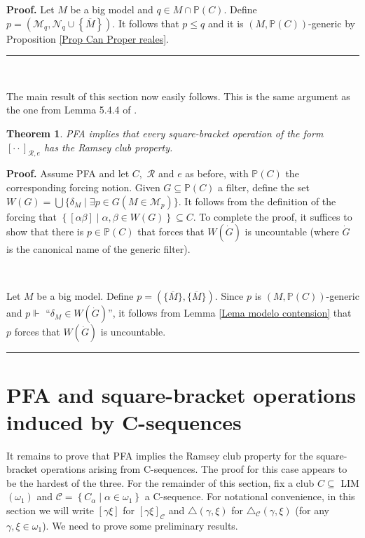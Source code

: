 \documentclass{article}
\newtheorem{theorem}{Theorem}
\newenvironment{proof}[1][Proof]{\noindent\textbf{#1.} }{\ \rule{0.5em}{0.5em}}
\begin{document}
\begin{proof}
Let $M$ be a big model and $q\in M\cap\mathbb{P}\left(  C\right)  .$ Define
$p=(\mathcal{M}_{q},\mathcal{N}_{q}\cup\left\{  \overline{M}\right\}  ).$ It
follows that $p\leq q$ and it is $(M,\mathbb{P}\left(  C\right)  )$-generic by
Proposition \ref{Prop Can Proper reales}.
\end{proof}

\qquad\ \qquad\ \qquad\ \ \ \ 

The main result of this section now easily follows. This is the same argument
as the one from Lemma 5.4.4 of \cite{Walks}.

\begin{theorem}
\textsf{PFA }implies that every square-bracket operation of the form
$[\cdot\cdot]_{\mathcal{R},e}$ has the Ramsey club property.
\label{PFA para reales}
\end{theorem}

\begin{proof}
Assume \textsf{PFA }and let $C,$ $\mathcal{R}$ and $e$ as before, with
$\mathbb{P}\left(  C\right)  $ the corresponding forcing notion. Given
$G\subseteq\mathbb{P}\left(  C\right)  $ a filter, define the set $W\left(
G\right)  =\bigcup\{\delta_{M}\mid\exists p\in G\left(  M\in\mathcal{M}%
_{p}\right)  \}.$ It follows from the definition of the forcing that $\left\{
\left[  \alpha\beta\right]  \mid\alpha,\beta\in W\left(  G\right)  \right\}
\subseteq C.$ To complete the proof, it suffices to show that there is
$p\in\mathbb{P}\left(  C\right)  $ that forces that $W(\dot{G})$ is
uncountable (where $\dot{G}$ is the canonical name of the generic filter).

\qquad\ \ \ \ \qquad\ \ 

Let $M$ be a big model. Define $p=(\{\overline{M}\},\{\overline{M}\}).$ Since
$p$ is $(M,\mathbb{P}\left(  C\right)  )$-generic and $p\Vdash$%
\textquotedblleft$\delta_{M}\in W(\dot{G})$\textquotedblright, it follows from
Lemma \ref{Lema modelo contension} that $p$ forces that $W(\dot{G})$ is uncountable.
\end{proof}

\section{PFA and square-bracket operations induced by C-sequences
\label{Seccion PFA walks}}

It remains to prove that \textsf{PFA }implies the Ramsey club property for the
square-bracket operations arising from \textsf{C}-sequences. The proof for
this case appears to be the hardest of the three. For the remainder of this
section, fix a club $C\subseteq$ \textsf{LIM}$\left(  \omega_{1}\right)  $ and
$\mathcal{C}=\left\{  C_{\alpha}\mid\alpha\in\omega_{1}\right\}  $ a
\textsf{C}-sequence. For notational convenience, in this section we will write
$\left[  \gamma\xi\right]  $ for $\left[  \gamma\xi\right]  _{\mathcal{C}}$
and $\triangle\left(  \gamma,\xi\right)  $ for $\triangle_{\mathcal{C}}\left(
\gamma,\xi\right)  $ (for any $\gamma,\xi\in\omega_{1}$). We need to prove
some preliminary results.
\end{document}
